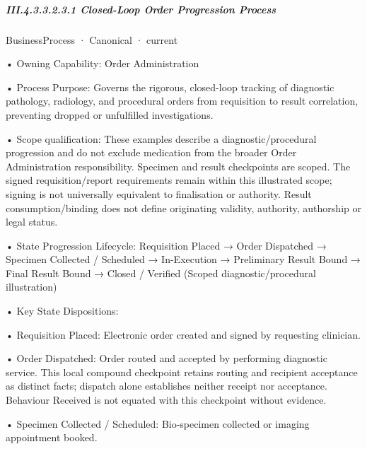 \subparagraph*{III.4.3.3.2.3.1 Closed-Loop Order Progression Process}
\label{navigation:III.4.3.3.2.3.1}

\label{element:e19a7c9594a4401e92450e4c31598982}
{\small BusinessProcess · Canonical · current}\par

•
Owning Capability: Order Administration



•
Process Purpose: Governs the rigorous, closed-loop tracking of diagnostic pathology, radiology, and procedural orders from requisition to result correlation, preventing dropped or unfulfilled investigations.



•
Scope qualification: These examples describe a diagnostic/procedural progression and do not exclude medication from the broader Order Administration responsibility. Specimen and result checkpoints are scoped. The signed requisition/report requirements remain within this illustrated scope; signing is not universally equivalent to finalisation or authority. Result consumption/binding does not define originating validity, authority, authorship or legal status.



•
State Progression Lifecycle: Requisition Placed → Order Dispatched → Specimen Collected / Scheduled → In-Execution → Preliminary Result Bound → Final Result Bound → Closed / Verified   (Scoped diagnostic/procedural illustration)



•
Key State Dispositions:



•
Requisition Placed: Electronic order created and signed by requesting clinician.



•
Order Dispatched: Order routed and accepted by performing diagnostic service. This local compound checkpoint retains routing and recipient acceptance as distinct facts; dispatch alone establishes neither receipt nor acceptance. Behaviour Received is not equated with this checkpoint without evidence.



•
Specimen Collected / Scheduled: Bio-specimen collected or imaging appointment booked.



